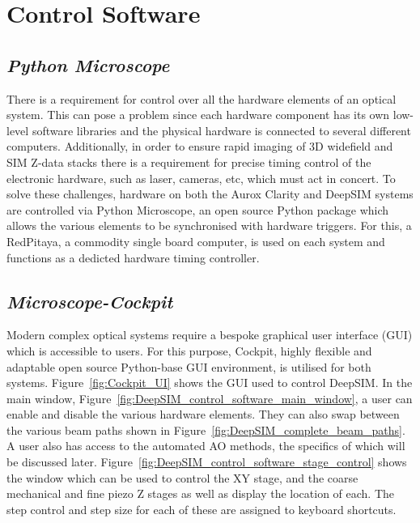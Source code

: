 \section{Control Software}
\label{sec:control_software}

\subsection{\textit{Python Microscope}}
\label{subsec:microscope}

There is a requirement for control over all the hardware elements of
an optical system. This can pose a problem since each hardware
component has its own low-level software libraries and the physical
hardware is connected to several different computers. Additionally, in
order to ensure rapid imaging of 3D widefield and SIM Z-data stacks
there is a requirement for precise timing control of the electronic
hardware, such as laser, cameras, etc, which must act in concert. To
solve these challenges, hardware on both the Aurox Clarity and DeepSIM
systems are controlled via Python Microscope, an open source Python
package which allows the various elements to be synchronised with
hardware triggers. For this, a RedPitaya, a commodity single board
computer, is used on each system and
functions as a dedicted hardware timing controller. 

\subsection{\textit{Microscope-Cockpit}}
\label{subsec:cockpit}

Modern complex optical systems require a bespoke graphical user interface (GUI) which is accessible to users. For this purpose, Cockpit, highly flexible and adaptable open source Python-base GUI environment, is utilised for both systems. Figure~\ref{fig:Cockpit_UI} shows the GUI used to control DeepSIM. In the main window, Figure~\ref{fig:DeepSIM_control_software_main_window}, a user can enable and disable the various hardware elements. They can also swap between the various beam paths shown in Figure~\ref{fig:DeepSIM_complete_beam_paths}. A user also has access to the automated AO methods, the specifics of which will be discussed later. Figure~\ref{fig:DeepSIM_control_software_stage_control} shows the window which can be used to control the XY stage, and the coarse mechanical and fine piezo Z stages as well as display the location of each. The step control and step size for each of these are assigned to keyboard shortcuts. 

